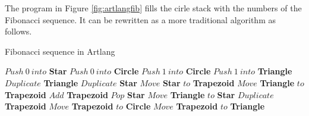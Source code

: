 The program in Figure \ref{fig:artlangfib} fills the cirle stack with the numbers of the Fibonacci sequence.
It can be rewritten as a more traditional algorithm as follows.

\begin{algorithm}[]
    \caption{Fibonacci sequence in Artlang}
    \begin{algorithmic}
    \State $Push~0~into$ \textbf{Star}
    \State $Push~0~into$ \textbf{Circle}
    \State $Push~1~into$ \textbf{Circle}
    \State $Push~1~into$ \textbf{Triangle}
        \State $Duplicate$ \textbf{Triangle}
        \State $Duplicate$ \textbf{Star}
        \State $Move$ \textbf{Star} $to$ \textbf{Trapezoid}
        \State $Move$ \textbf{Triangle} $to$ \textbf{Trapezoid}
        \State $Add$ \textbf{Trapezoid}
        \State $Pop$ \textbf{Star}
        \State $Move$ \textbf{Triangle} $to$ \textbf{Star}
        \State $Duplicate$ \textbf{Trapezoid}
        \State $Move$ \textbf{Trapezoid} $to$ \textbf{Circle}
        \State $Move$ \textbf{Trapezoid} $to$ \textbf{Triangle}
    \EndWhile
    \end{algorithmic}
\end{algorithm}

